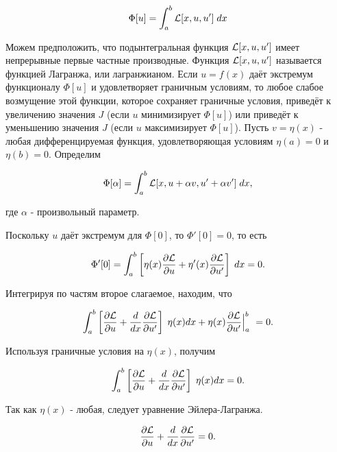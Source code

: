 \documentclass{article}
\begin{document}
\begin{displaymath}
	\Phi[u] = \int_{a}^{b} \mathcal{L}[x, u, u'] \; dx
\end{displaymath}

Можем предположить, что подынтегральная функция $\mathcal{L}[x, u, u']$ имеет непрерывные первые частные производные. Функция $\mathcal{L}[x, u, u']$ называется функцией Лагранжа, или лагранжианом. Если $u = f(x)$ даёт экстремум функционалу $\Phi[u]$ и удовлетворяет граничным условиям, то любое слабое возмущение этой функции, которое сохраняет граничные условия, приведёт к увеличению значения $J$ (если $u$ минимизирует $\Phi[u]$) или приведёт к уменьшению значения $J$ (если $u$ максимизирует $\Phi[u]$).
Пусть $v = \eta(x)$ - любая дифференцируемая функция, удовлетворяющая условиям $\eta(a) = 0$ и $\eta(b) = 0$.
Определим

\begin{displaymath}
	\Phi[\alpha] = \int_{a}^{b} \mathcal{L}[x, u + \alpha v, u' +  \alpha v'] \; dx,
\end{displaymath}

\noindent где $\alpha$ - произвольный параметр.

Поскольку $u$ даёт экстремум для $\Phi[0]$, то $\Phi'[0] = 0$, то есть

\begin{displaymath}
	\Phi'[0] = \int_{a}^{b} \left[ \eta(x) \frac{\partial \mathcal{L}}{\partial u} + \eta ' (x) \frac{\partial \mathcal{L}}{\partial u'} \right]  \; dx = 0.
\end{displaymath}

\noindent Интегрируя по частям второе слагаемое, находим, что 

\begin{displaymath}
	\int_{a}^{b} \left[\frac{\partial \mathcal{L}}{\partial u} + \frac{d}{dx} \frac{\partial \mathcal{L}}{\partial u'} \right]  \; \eta(x) dx + \eta(x) \frac{\partial \mathcal{L}}{\partial u'} \Big|_a^b \ = 0.
\end{displaymath}

\noindent Используя граничные условия на $\eta(x)$, получим

\begin{displaymath}
	\int_{a}^{b} \left[\frac{\partial \mathcal{L}}{\partial u} + \frac{d}{dx} \frac{\partial \mathcal{L}}{\partial u'} \right]  \; \eta(x) dx = 0.
\end{displaymath}

\noindent Так как $\eta(x)$ - любая, следует уравнение Эйлера-Лагранжа.

\begin{equation}\label{euler_equation}
	\frac{\partial \mathcal{L}}{\partial u} + \frac{d}{dx} \frac{\partial \mathcal{L}}{\partial u'} = 0.
\end{equation}
\end{document}
